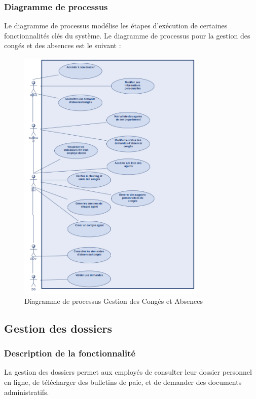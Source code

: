 \subsubsection{Diagramme de processus}
Le diagramme de processus modélise les étapes d'exécution de certaines fonctionnalités clés du système. Le diagramme de processus pour la gestion des congés et des absences est le suivant :
\begin{figure}[H]
    \centering
    \includegraphics[width=0.8\textwidth]{images/diagrammes/flowcharts/conges.png}
    \caption{Diagramme de processus Gestion des Congés et Absences}
    \label{fig:flow_gestion_conges}
\end{figure}

\subsection{Gestion des dossiers}
\subsubsection{Description de la fonctionnalité}
La gestion des dossiers permet aux employés de consulter leur dossier personnel en ligne, de télécharger des bulletins de paie, et de demander des documents administratifs.

